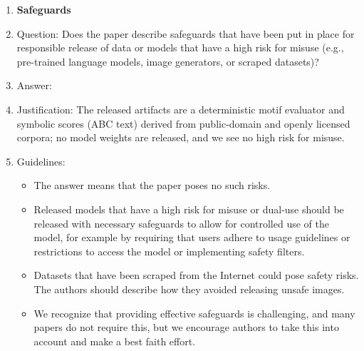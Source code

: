 \documentclass{article}
\begin{document}
\begin{enumerate}
\item {\bf Safeguards}
    \item[] Question: Does the paper describe safeguards that have been put in place for responsible release of data or models that have a high risk for misuse (e.g., pre-trained language models, image generators, or scraped datasets)?
    \item[] Answer: \answerNA{}
    \item[] Justification: The released artifacts are a deterministic motif evaluator and symbolic scores (ABC text) derived from public-domain and openly licensed corpora; no model weights are released, and we see no high risk for misuse.
    \item[] Guidelines:
    \begin{itemize}
        \item The answer \answerNA{} means that the paper poses no such risks.
        \item Released models that have a high risk for misuse or dual-use should be released with necessary safeguards to allow for controlled use of the model, for example by requiring that users adhere to usage guidelines or restrictions to access the model or implementing safety filters. 
        \item Datasets that have been scraped from the Internet could pose safety risks. The authors should describe how they avoided releasing unsafe images.
        \item We recognize that providing effective safeguards is challenging, and many papers do not require this, but we encourage authors to take this into account and make a best faith effort.
    \end{itemize}


\end{enumerate}
\end{document}
